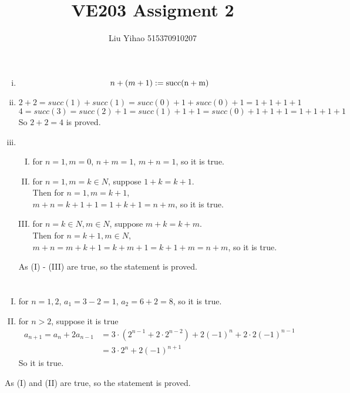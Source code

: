 \documentclass{article}
\title{VE203 Assigment 2}
\author{Liu Yihao 515370910207}
\date{}
\begin{document}
\maketitle

\section{}
\begin{enumerate}[i)]
\item
$$n+(m+1):=\rm{succ}(n+m)$$
\item
$$2+2=succ(1)+succ(1)=succ(0)+1+succ(0)+1=1+1+1+1$$
$$4=succ(3)=succ(2)+1=succ(1)+1+1=succ(0)+1+1+1=1+1+1+1$$
So $2+2=4$ is proved.
\item
\begin{enumerate}[(I)]
\item
for $n=1,m=0$, $n+m=1$, $m+n=1$, so it is true.
\item
for $n=1,m=k\in N$, suppose $1+k=k+1$.\\
Then for $n=1,m=k+1$,\\
$m+n=k+1+1=1+k+1=n+m$, so it is true.
\item
for $n=k\in N,m\in N$, suppose $m+k=k+m$.\\
Then for $n=k+1,m\in N$,\\
$m+n=m+k+1=k+m+1=k+1+m=n+m$, so it is true.
\end{enumerate}
As (I) - (III) are true, so the statement is proved.
\end{enumerate}


\section{}
\begin{enumerate}[(I)]
\item
for $n=1,2$, $a_1=3-2=1$, $a_2=6+2=8$, so it is true.
\item
for $n>2$, suppose it is true
\begin{align*}
a_{n+1}=a_n+2a_{n-1}&=3\cdot(2^{n-1}+2\cdot2^{n-2})+2(-1)^{n}+2\cdot2(-1)^{n-1}\\
&=3\cdot2^n+2(-1)^{n+1}
\end{align*}
So it is true.
\end{enumerate}
As (I) and (II) are true, so the statement is proved.

\section{}
\end{document}
